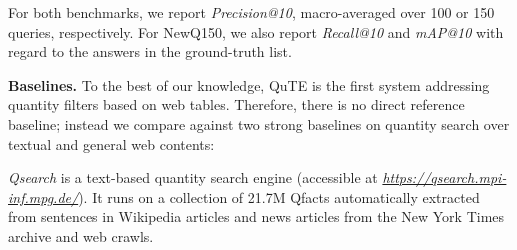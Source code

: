 \vspace{0.1cm}
For both benchmarks, we report  \textit{Precision@10}, 
macro-averaged over 100 or 150 queries, respectively. 
For NewQ150, we also report \textit{Recall@10} and \textit{mAP@10} with
regard to the 
answers in the ground-truth list.


\vspace{0.1cm}
\noindent \textbf{Baselines.} 
To the best of our
knowledge, QuTE is the first system addressing quantity filters based on web tables. Therefore, there is no direct reference baseline; instead we compare against two strong baselines
on quantity search over textual and general web contents:
\squishlist
\item \textit{Qsearch} is a text-based quantity search engine \cite{DBLP:conf/semweb/HoIPBW19,DBLP:conf/wsdm/HoPKBW20}
(accessible at \textit{\url{https://qsearch.mpi-inf.mpg.de/}}).
It runs on a collection of 21.7M Qfacts automatically extracted from
sentences in Wikipedia articles and 
news articles from the New York Times archive and web crawls.

